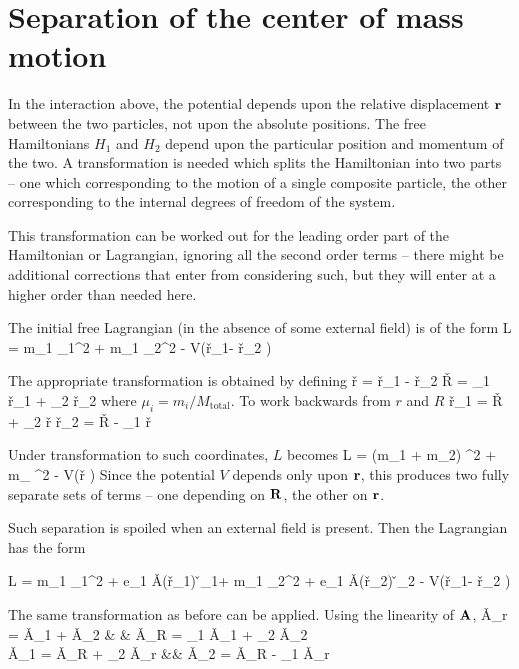  
\section{Separation of the center of mass motion}
In the interaction above, the potential depends upon the relative displacement $\mathbf{r}$ between the two particles, not upon the absolute positions.  The free Hamiltonians $H_1$ and $H_2$ depend upon the particular position and momentum of the two.  A transformation is needed which splits the Hamiltonian into two parts -- one which corresponding to the motion of a single composite particle, the other corresponding to the internal degrees of freedom of the system.

This transformation can be worked out for the leading order part of the Hamiltonian or Lagrangian, ignoring all the second order terms -- there might be additional corrections that enter from considering such, but they will enter at a higher order than needed here.

The initial free Lagrangian (in the absence of some external field) is of the form
\beq
	L =  m_1 _1^2   +  m_1 _2^2 - V(\v{r_1}- \v{r_2} )	 
\eeq

The appropriate transformation is obtained by defining
\beq
	\v{r} = \v{r}_1 - \v{r}_2  \hspace{4em}   \v{R} = \mu_1 \v{r}_1 + \mu_2 \v{r}_2
\eeq 
where $\mu_i = m_i / M_\text{total}$. 
To work backwards from $r$ and $R$
\beq
	\v{r}_1 = \v{R} + \mu_2 \v{r}  \hspace{4em} \v{r}_2 = \v{R} - \mu_1 \v{r}\\
\eeq

Under transformation to such coordinates, $L$ becomes
\beq
		L =  (m_1 + m_2) ^2   +  m_ ^2 - V(\v{r} )	 
\eeq
Since the potential $V$ depends only upon $\mathbf{r}$, this produces two fully separate sets of terms -- one depending on $\mathbf{R}$, the other on $\mathbf{r}$.

Such separation is spoiled when an external field is present.  Then the Lagrangian has the form

\beq
	L =  m_1 _1^2  + e_1 \v{A}(\v{r}_1) \cdot \v{}_1+  m_1 _2^2 +  e_1 \v{A}(\v{r}_2) \cdot \v{}_2  - V(\v{r_1}- \v{r_2} )	 
\eeq

The same transformation as before can be applied.  Using the linearity of $\mathbf{A}$, 
\beqa
	\v{A}_r = \v{A}_1 + \v{A}_2 & \hspace{4em}& \v{A}_R = \mu_1 \v{A}_1 + \mu_2 \v{A}_2	\\
		\v{A}_1 = \v{A}_R + \mu_2 \v{A}_r  &\hspace{4em}& \v{A}_2 = \v{A}_R - \mu_1 \v{A}_r
\eeqa

